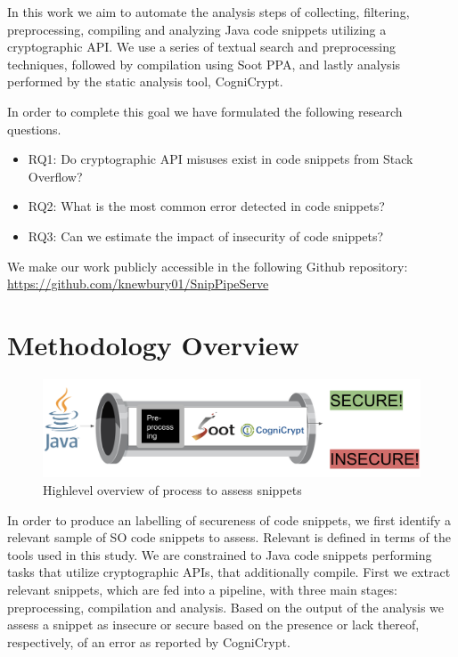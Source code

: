 \documentclass[10pt, conference]{IEEEtran}
\begin{document}
In this work we aim to automate the analysis steps of collecting, filtering, preprocessing, compiling and analyzing Java code snippets utilizing a cryptographic API. We use a series of textual search and preprocessing techniques, followed by compilation using Soot PPA, and lastly analysis performed by the static analysis tool, CogniCrypt.


In order to complete this goal we have formulated the following research questions.
\begin{itemize}
 \item  RQ1: Do cryptographic API misuses exist in code snippets from Stack Overflow?

\item  RQ2: What is the most common error detected in code snippets?

\item  RQ3: Can we estimate the impact of insecurity of code snippets?

\end{itemize}

We make our work publicly accessible in the following Github repository:
\url{https://github.com/knewbury01/SnipPipeServe}


\section{Methodology Overview}

\begin{figure}[h]
\begin{center}
\includegraphics[width=1.0\linewidth]{pipeline.png}
\caption{Highlevel overview of process to assess snippets}
\end{center}
\end{figure}

In order to produce an labelling of secureness of code snippets, we first identify a relevant sample of SO code snippets to assess. Relevant is defined in terms of the tools used in this study. We are constrained to Java code snippets performing tasks that utilize cryptographic APIs, that additionally compile. First we extract relevant snippets, which are fed into a pipeline, with three main stages: preprocessing, compilation and analysis. Based on the output of the analysis we assess a snippet as insecure or secure based on the presence or lack thereof, respectively, of an error as reported by CogniCrypt.
\end{document}
